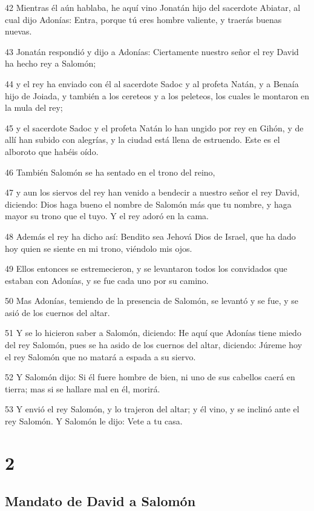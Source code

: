 \par 42 Mientras él aún hablaba, he aquí vino Jonatán hijo del sacerdote Abiatar, al cual dijo Adonías: Entra, porque tú eres hombre valiente, y traerás buenas nuevas.
\par 43 Jonatán respondió y dijo a Adonías: Ciertamente nuestro señor el rey David ha hecho rey a Salomón;
\par 44 y el rey ha enviado con él al sacerdote Sadoc y al profeta Natán, y a Benaía hijo de Joiada, y también a los cereteos y a los peleteos, los cuales le montaron en la mula del rey;
\par 45 y el sacerdote Sadoc y el profeta Natán lo han ungido por rey en Gihón, y de allí han subido con alegrías, y la ciudad está llena de estruendo. Este es el alboroto que habéis oído.
\par 46 También Salomón se ha sentado en el trono del reino,
\par 47 y aun los siervos del rey han venido a bendecir a nuestro señor el rey David, diciendo: Dios haga bueno el nombre de Salomón más que tu nombre, y haga mayor su trono que el tuyo. Y el rey adoró en la cama.
\par 48 Además el rey ha dicho así: Bendito sea Jehová Dios de Israel, que ha dado hoy quien se siente en mi trono, viéndolo mis ojos.
\par 49 Ellos entonces se estremecieron, y se levantaron todos los convidados que estaban con Adonías, y se fue cada uno por su camino.
\par 50 Mas Adonías, temiendo de la presencia de Salomón, se levantó y se fue, y se asió de los cuernos del altar.
\par 51 Y se lo hicieron saber a Salomón, diciendo: He aquí que Adonías tiene miedo del rey Salomón, pues se ha asido de los cuernos del altar, diciendo: Júreme hoy el rey Salomón que no matará a espada a su siervo.
\par 52 Y Salomón dijo: Si él fuere hombre de bien, ni uno de sus cabellos caerá en tierra; mas si se hallare mal en él, morirá.
\par 53 Y envió el rey Salomón, y lo trajeron del altar; y él vino, y se inclinó ante el rey Salomón. Y Salomón le dijo: Vete a tu casa.

\chapter{2}

\section*{Mandato de David a Salomón}


